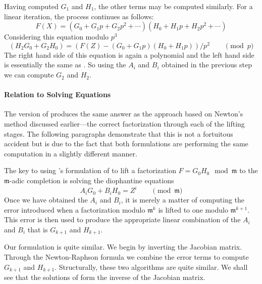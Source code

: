 {Having computed $G_1$ and $H_1$, the other terms may be computed
similarly.  For a linear iteration, the process continues as follows:
\[
F(X) = (G_0 + G_1 p + G_2 p^2 + \cdots) 
(H_0 + H_1 p + H_2 p^2 + \cdots)
\]
Considering this equation modulo $p^3$
\[
(H_2 G_0 + G_2 H_0) = \left( F(Z) - 
  (G_0 + G_1 p)(H_0 + H_1 p) \right) / p^2 \qquad \pmod{p}
\]
The right hand side of this equation is again a polynomial and the
left hand side is essentially the same as .  So
using the $A_i$ and $B_i$ obtained in the previous step we can compute
$G_2$ and $H_2$.

\paragraph{Relation to Solving Equations}

The {\Zassenhaus} version of  produces the same 
answer as the approach based on Newton's method discussed earlier---the 
correct factorization through each of the lifting stages.  The
following paragraphs demonstrate that this is not a fortuitous
accident but is due to the fact that both formulations are performing
the same computation in a slightly different manner.

The key to using {\Zassenhaus}'s formulation of  to 
lift a factorization $F = G_0 H_0 \mod{\mathfrak{m}}$ to the $\mathfrak{
m}$-adic completion is solving the diophantine equations
\begin{equation} \label{Hensel:ZassDio:Eq}
A_i G_0 + B_i H_0 = Z^i \qquad\pmod{\mathfrak{m}}
\end{equation}
Once we have obtained the $A_i$ and $B_i$, it is merely a matter of
computing the error introduced when a factorization modulo $\mathfrak{m}^k$ 
is lifted to one modulo $\mathfrak{m}^{k+1}$.
This error is then used to produce the appropriate linear combination of the
$A_i$ and $B_i$ that is $G_{k+1}$ and  $H_{k+1}$.

Our formulation is quite similar.  We begin by inverting the Jacobian
matrix.  Through the Newton-Raphson formula we combine the error terms
to compute $G_{k+1}$ and $H_{k+1}$.  Structurally, these two algorithms 
are quite similar.  We shall see that the solutions of 
 form the inverse of the Jacobian matrix.

}
